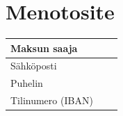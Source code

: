\documentclass[a4paper,12pt,finnish]{scrartcl}
\begin{document}
\section*{Menotosite}
\vspace*{.5cm}

\begin{Form}
\begin{tabular}{|lc|l|}
\hline
Maksun saaja & \phantom{a} & \phantom{\rule{0pt}{1.3em}}\raisebox{-.39ex}{\rule{0pt}{1em}\TextField[name=nimi,width=20em,bordercolor=1 1 1]{}}\\
\hline
S\"{a}hk\"{o}posti & & \phantom{\rule{0pt}{1.3em}}\raisebox{-.39ex}{\rule{0pt}{1em}\TextField[name=email,width=20em,bordercolor=1 1 1]{}}\\
\hline
Puhelin & & \phantom{\rule{0pt}{1.3em}}\raisebox{-.45ex}{\rule{0pt}{1em}\TextField[name=puhelin,width=20em,bordercolor=1 1 1]{}}\\
\hline
Tilinumero (IBAN) & & \phantom{\rule{0pt}{1.3em}}\raisebox{-.39ex}{\rule{0pt}{1em}\TextField[name=tili,width=20em,bordercolor=1 1 1]{}}\\
\hline
\end{tabular}

\vspace*{1cm}

\begin{center}


\end{center}
\end{Form}
\end{document}
